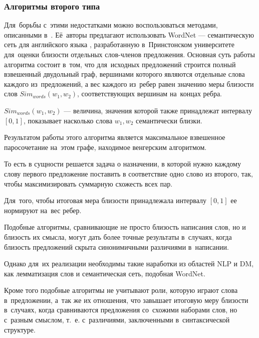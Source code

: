 \subsubsection{Алгоритмы второго типа}
\label{sec:second_type_algorithm}
Для~борьбы с~этими недостатками можно воспользоваться методами, описанными в~\cite{wordnetSim}.
Её~авторы предлагают использовать WordNet --- семантическую сеть для английского языка \cite{wordnet}, 
разработанную в~Принстонском университете для~оценки близости отдельных слов-членов предложения.
Основная суть работы алгоритма состоит в~том, 
что для~исходных предложений строится полный взвешенный двудольный граф, 
вершинами которого являются отдельные слова каждого из~предложений, 
а вес каждого из~ребер равен значению меры близости слов $Sim_{words}(w_1, w_2)$,
соответствующих вершинам на~концах ребра. 

$Sim_{words}(w_1, w_2)$ --- величина, значения которой также принадлежат интервалу $[0,1]$,
показывает насколько слова $w_1,w_2$ семантически близки.

Результатом работы этого алгоритма является максимальное взвешенное паросочетание на~этом графе, 
находимое венгерским алгоритмом\cite{hungarian}.

То есть в сущности решается задача о назначении\cite{oper_research}, в которой
нужно каждому слову первого предложение поставить в соответствие одно слово из второго,
так, чтобы максимизировать суммарную схожесть всех пар.

Для~того, чтобы итоговая мера близости принадлежала интервалу $[0,1]$ ее нормируют на~вес ребер.

Подобные алгоритмы, сравнивающие не просто близость написания слов, 
но и близость их смысла, могут дать более точные результаты в~случаях, 
когда близость предложений скрыта синонимичными различиями в~написании.

Однако для~их реализации необходимы такие наработки из областей NLP и DM,
как лемматизация слов и семантическая сеть, подобная WordNet\cite{wordnet}.


Кроме того подобные алгоритмы не учитывают роли, которую играют слова в~предложении,
а~так же их отношения, что завышает итоговую меру близости в~случаях,
когда сравниваются предложения со~схожими наборами слов, но с~разным смыслом,
т.~е. с~различиями, заключенными в~синтаксической структуре.

